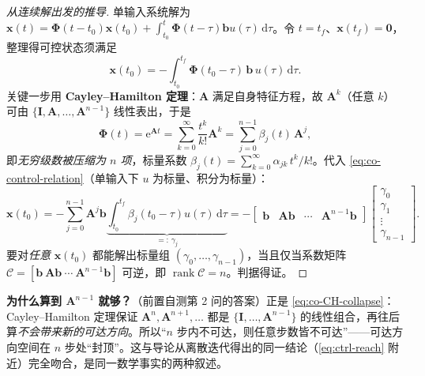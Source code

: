 \begin{proof}[从连续解出发的推导]
单输入系统解为 $\mathbf{x}(t)=\boldsymbol{\Phi}(t-t_0)\mathbf{x}(t_0)+\int_{t_0}^t\boldsymbol{\Phi}(t-\tau)\mathbf{b}u(\tau)\,\mathrm d\tau$。令 $t=t_f$、$\mathbf{x}(t_f)=\mathbf{0}$，整理得可控状态须满足
\begin{equation}
  \mathbf{x}(t_0)=-\int_{t_0}^{t_f}\boldsymbol{\Phi}(t_0-\tau)\,\mathbf{b}\,u(\tau)\,\mathrm d\tau.
  \label{eq:co-control-relation}
\end{equation}
关键一步用 \textbf{Cayley--Hamilton 定理}：$\mathbf{A}$ 满足自身特征方程，故 $\mathbf{A}^k$（任意 $k$）可由 $\{\mathbf{I},\mathbf{A},\dots,\mathbf{A}^{n-1}\}$ 线性表出，于是
\begin{equation}
  \boldsymbol{\Phi}(t)=\mathrm{e}^{\mathbf{A}t}=\sum_{k=0}^{\infty}\frac{t^k}{k!}\mathbf{A}^k
  =\sum_{j=0}^{n-1}\beta_j(t)\,\mathbf{A}^j,
  \label{eq:co-CH-collapse}
\end{equation}
即\emph{无穷级数被压缩为 $n$ 项}，标量系数 $\beta_j(t)=\sum_{k=0}^{\infty}\alpha_{jk}\,t^k/k!$。代入 \cref{eq:co-control-relation}（单输入下 $u$ 为标量、积分为标量）：
\[
  \mathbf{x}(t_0)=-\sum_{j=0}^{n-1}\mathbf{A}^j\mathbf{b}\underbrace{\int_{t_0}^{t_f}\beta_j(t_0-\tau)u(\tau)\,\mathrm d\tau}_{=:\,\gamma_j}
  =-\begin{bmatrix}\mathbf{b}&\mathbf{A}\mathbf{b}&\cdots&\mathbf{A}^{n-1}\mathbf{b}\end{bmatrix}
  \begin{bmatrix}\gamma_0\\ \gamma_1\\ \vdots\\ \gamma_{n-1}\end{bmatrix}.
\]
要对\emph{任意} $\mathbf{x}(t_0)$ 都能解出标量组 $(\gamma_0,\dots,\gamma_{n-1})$，当且仅当系数矩阵 $\mathcal{C}=[\mathbf{b}\ \mathbf{A}\mathbf{b}\ \cdots\ \mathbf{A}^{n-1}\mathbf{b}]$ 可逆，即 $\operatorname{rank}\mathcal{C}=n$。判据得证。
\end{proof}

\begin{insight}
\textbf{为什么算到 $\mathbf{A}^{n-1}$ 就够？}\;（前置自测第 2 问的答案）正是 \cref{eq:co-CH-collapse}：Cayley--Hamilton 定理保证 $\mathbf{A}^n,\mathbf{A}^{n+1},\dots$ 都是 $\{\mathbf{I},\dots,\mathbf{A}^{n-1}\}$ 的线性组合，再往后算\emph{不会带来新的可达方向}。所以“$n$ 步内不可达，则任意步数皆不可达”——可达方向空间在 $n$ 步处“封顶”。这与导论从离散迭代得出的同一结论（\cref{eq:ctrl-reach} 附近）完全吻合，是同一数学事实的两种叙述。
\end{insight}

